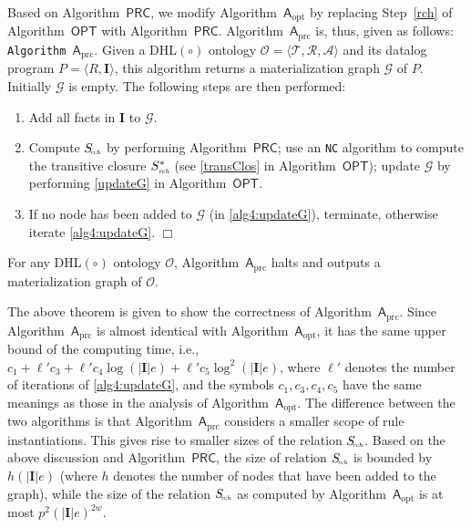 Based on Algorithm~$\mathsf{PRC}$, we modify Algorithm~$\mathsf{A}_{\text{opt}}$
by replacing Step~\ref{rch} of Algorithm~$\mathsf{OPT}$
with Algorithm~$\mathsf{PRC}$. Algorithm~$\mathsf{A}_{\text{prc}}$
is, thus, given as follows:\\

\noindent\texttt{Algorithm~$\mathsf{A}_{\text{prc}}$}. Given
a DHL$(\circ)$ ontology $\mathcal{O}=\langle\mathcal{T},\mathcal{R},\mathcal{A}\rangle$ and its
datalog program $P=\langle R, \textbf{I}\rangle$, this algorithm
returns a materialization graph $\mathcal{G}$ of $P$.
Initially $\mathcal{G}$ is empty. The following steps are then performed:
\begin{enumerate}[leftmargin=8ex,label=(\textit{Step \arabic*}),ref=Step~\arabic*]
\item Add all facts in $\textbf{I}$ to $\mathcal{G}$.\label{alg4:addFacts}
\item Compute $S_{\textit{\!\tiny rch}}$ by performing Algorithm~$\mathsf{PRC}$; use an \texttt{NC}
    algorithm to compute the transitive closure $S^*_{\textit{\tiny rch}}$ (see \ref{transClos} in Algorithm~$\mathsf{OPT}$);
    update $\mathcal{G}$ by performing \ref{updateG} in Algorithm~$\mathsf{OPT}$.\label{alg4:updateG}
\item If no node has been added to $\mathcal{G}$ (in \ref{alg4:updateG}), terminate,
    otherwise iterate \ref{alg4:updateG}. \label{alg4:halt}\hfill$\Box$
\end{enumerate}

\begin{theorem}\label{theorem:aprc}
For any DHL$(\circ)$ ontology $\mathcal{O}$, Algorithm~$\mathsf{A}_{\text{prc}}$ halts and outputs
a materialization graph of $\mathcal{O}$.
\end{theorem}

The above theorem is given to show the correctness of Algorithm~$\mathsf{A}_{\text{prc}}$.
Since Algorithm~$\mathsf{A}_{\text{prc}}$ is almost identical with Algorithm~$\mathsf{A}_{\text{opt}}$,
it has the same upper bound of the computing time, i.e., $c_1+\ell'c_3 + \ell'c_4\log(|\textbf{I}|e) +\ell'c_5\log^2(|\textbf{I}|e)$,
where $\ell'$ denotes the number of iterations of \ref{alg4:updateG}, and the symbols
$c_1, c_3, c_4, c_5$ have the same meanings as those in the analysis of Algorithm~$\mathsf{A}_{\text{opt}}$.
The difference between the two algorithms is that Algorithm~$\mathsf{A}_{\text{prc}}$
considers a smaller scope of rule instantiations. This gives rise to smaller sizes of
the relation $S_{\textit{\!\tiny rch}}$. Based on the above discussion and Algorithm~$\mathsf{PRC}$,
the size of relation $S_{\textit{\!\tiny rch}}$ is bounded by
$h(|\textbf{I}|e)$ (where $h$
denotes the number of nodes that have been added to the graph), while
the size of the relation $S_{\textit{\!\tiny rch}}$ as computed by Algorithm~$\mathsf{A}_{\text{opt}}$
is at most $p^2(|\textbf{I}|e)^{2w}$.

